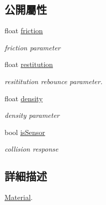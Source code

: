 \subsection*{公開屬性}
\begin{DoxyCompactItemize}
\item 
float \hyperlink{class_magnum_1_1_physics3_1_1_material_abbb9da521f249d85386e8065f123f3c3}{friction}\hypertarget{class_magnum_1_1_physics3_1_1_material_abbb9da521f249d85386e8065f123f3c3}{}\label{class_magnum_1_1_physics3_1_1_material_abbb9da521f249d85386e8065f123f3c3}

\begin{DoxyCompactList}\small\item\em friction parameter \end{DoxyCompactList}\item 
float \hyperlink{class_magnum_1_1_physics3_1_1_material_a285ed1bbe20674f08c9f44118c3c92ec}{restitution}
\begin{DoxyCompactList}\small\item\em resititution rebounce parameter. \end{DoxyCompactList}\item 
float \hyperlink{class_magnum_1_1_physics3_1_1_material_a05fdeeacf5950c5a047e34326466c61d}{density}\hypertarget{class_magnum_1_1_physics3_1_1_material_a05fdeeacf5950c5a047e34326466c61d}{}\label{class_magnum_1_1_physics3_1_1_material_a05fdeeacf5950c5a047e34326466c61d}

\begin{DoxyCompactList}\small\item\em density parameter \end{DoxyCompactList}\item 
bool \hyperlink{class_magnum_1_1_physics3_1_1_material_aeb5db30689e40d8ce3b5cdf4b97c87a9}{is\+Sensor}\hypertarget{class_magnum_1_1_physics3_1_1_material_aeb5db30689e40d8ce3b5cdf4b97c87a9}{}\label{class_magnum_1_1_physics3_1_1_material_aeb5db30689e40d8ce3b5cdf4b97c87a9}

\begin{DoxyCompactList}\small\item\em collision response \end{DoxyCompactList}\end{DoxyCompactItemize}


\subsection{詳細描述}
\hyperlink{class_magnum_1_1_physics3_1_1_material}{Material}. 

